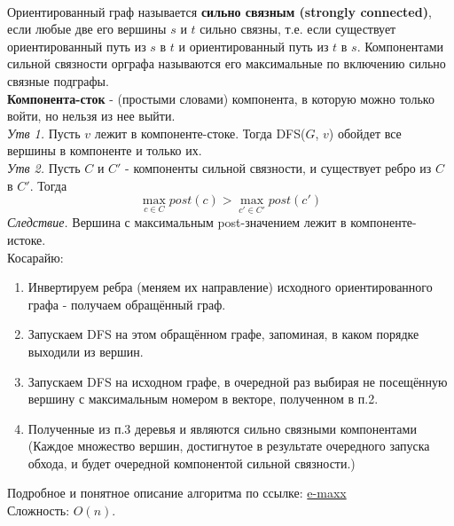 \\
Ориентированный граф называется {\bf сильно связным (strongly connected)}, если любые две его вершины $s$ и $t$ сильно связны, т.е. если существует ориентированный путь из $s$ в $t$ и ориентированный путь из $t$ в $s$. Компонентами сильной связности орграфа называются его максимальные по включению сильно связные подграфы.\\
{\bf Компонента-сток} - (простыми словами) компонента, в которую можно только войти, но нельзя из нее выйти.\\
{\it Утв 1.} Пусть $v$ лежит в компоненте-стоке. Тогда DFS($G$, $v$) обойдет все вершины в компоненте и только их.\\
{\it Утв 2.} Пусть $C$ и $C'$ - компоненты сильной связности, и существует ребро из $C$ в $C'$. Тогда
$$
\max\limits_{c\in C} post(c) > \max\limits_{c'\in C'} post(c')
$$
{\it Следствие.} Вершина с максимальным post-значением лежит в компоненте-истоке.\\

 Косарайю:
\begin{enumerate}
\item Инвертируем ребра (меняем их направление) исходного ориентированного графа - получаем обращённый граф.
\item Запускаем DFS на этом обращённом графе, запоминая, в каком порядке выходили из вершин.
\item Запускаем DFS на исходном графе, в очередной раз выбирая не посещённую вершину с максимальным номером в векторе, полученном в п.2.
\item Полученные из п.3 деревья и являются сильно связными компонентами (Каждое множество вершин, достигнутое в результате очередного запуска обхода, и будет очередной компонентой сильной связности.)
\end{enumerate}
Подробное и понятное описание алгоритма по ссылке: \href{https://e-maxx.ru/algo/strong_connected_components}{e-maxx}\\
Сложность: $O(n)$. 

